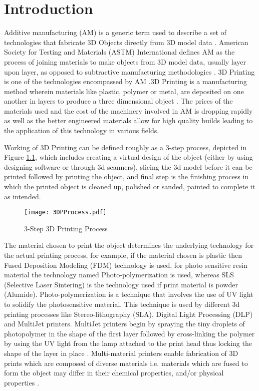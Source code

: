 \chapter{Introduction}
Additive manufacturing (AM) is a generic term used to describe a set of technologies that fabricate 3D Objects directly from 3D model data \cite{KRUTH}. American Society for Testing and Materials (ASTM) International defines AM as the process of joining materials to make objects from 3D model data, usually layer upon layer, as opposed to subtractive manufacturing methodologies \cite{cwig} . 3D Printing is one of the technologies encompassed by AM \cite{Conner}.3D Printing is a manufacturing method  wherein materials like plastic, polymer or metal, are deposited on one another in layers to produce a three dimensional object \cite{sdl}.  The prices of the materials used and the cost of the machinery involved in AM is dropping rapidly as well as the better engineered materials allow for high quality builds leading to the application of this technology in various fields. \newline

Working of 3D Printing can be defined roughly as a 3-step process, depicted in Figure \ref{fig:DP}, which includes creating a virtual design of the object (either by using designing software or through 3d scanners), slicing the 3d model before it can be printed followed by printing the object, and final step is the finishing process in which the printed object is cleaned up, polished or sanded, painted to complete it as intended.  
\begin{figure}[ht!]
\centering
\texttt{[image: 3DPProcess.pdf]}
\caption{3-Step 3D Printing Process}
\label{fig:DP}
\end{figure}

The material chosen to print the object determines the underlying technology for the actual printing process, for example, if the material chosen is plastic then Fused Deposition Modeling (FDM) technology is used, for photo sensitive resin material the technology named Photo-polymerization is used, whereas SLS (Selective Laser Sintering) is the technology used if print material is powder (Alumide). Photo-polymerization is a technique that involves the use of UV light to solidify the photosensitive material.  This technique is used by different 3d printing processes like Stereo-lithography (SLA), Digital Light Processing (DLP) and MultiJet printers.  MultiJet printers begin by spraying the tiny droplets of photopolymer in the shape of the first layer followed by cross-linking the polymer by using the UV light from the lamp attached to the print head thus locking the shape of the layer in place \cite{dpW}. Multi-material printers enable fabrication of 3D prints which are composed of diverse materials i.e. materials which are fused to form the object may differ in their chemical properties, and/or physical properties \cite{Doubrovski}.\newline

